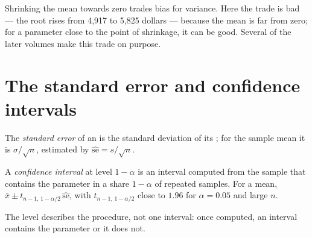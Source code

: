 \label{out:b1:sampling-and-inference:bias-variance}

Shrinking the mean towards zero trades bias for variance. Here the trade is
bad --- the root  rises from 4,917 to 5,825 dollars ---
because the mean is far from zero; for a parameter close to the point of
shrinkage, it can be good. Several  of the later volumes make
this trade on purpose.

\section{The standard error and confidence intervals}\label{sec:b1:sampling-and-inference:intervals}

\begin{definition}\label{def:b1:sampling-and-inference:standard-error}
The \emph{standard error} of an  is the standard deviation of its
; for the sample mean it is $\sigma/\sqrt n$, estimated by
$\widehat{\mathrm{se}} = s/\sqrt n$.
\end{definition}

\begin{definition}\label{def:b1:sampling-and-inference:confidence-interval}
A \emph{confidence interval} at level $1 - \alpha$ is an interval computed from the
sample that contains the parameter in a share $1 - \alpha$ of repeated samples. For a
mean, $\bar x \pm t_{n-1,\,1-\alpha/2}\,\widehat{\mathrm{se}}$, with $t_{n-1,\,1-\alpha/2}$ close to $1.96$ for $\alpha = 0.05$ and large $n$.
\end{definition}

The level describes the procedure, not one interval: once computed, an
interval contains the parameter or it does not.

\label{lst:b1:sampling-and-inference:interval}

\label{out:b1:sampling-and-inference:interval}

